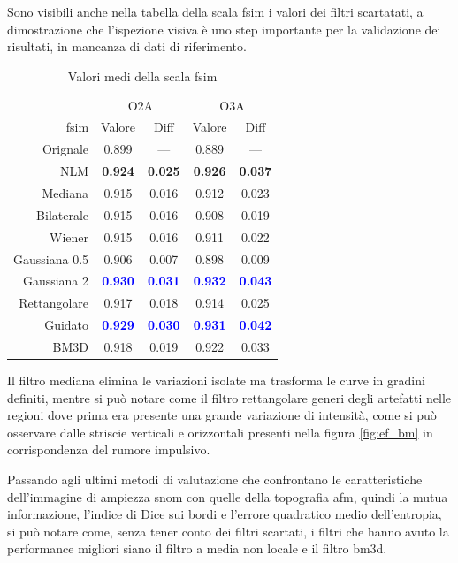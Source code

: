 \documentclass[../main.tex]{subfiles}
\begin{document}
Sono visibili anche nella tabella della scala \acrshort{fsim} i valori dei filtri scartatati, a dimostrazione che l'ispezione visiva è uno step importante per la validazione dei risultati, in mancanza di dati di riferimento.\medskip

\begin{table}[ht]
	\centering
	\begin{tabular}{r||cc|cc}
		&  \multicolumn{2}{c|}{O2A} &  \multicolumn{2}{c}{O3A}  \\
		\acrshort{fsim}\hspace{10pt} & Valore & Diff & Valore & Diff \\		\hline\hline
		Orignale   		& 0.899 & ---   & 0.889 & --- \\
		NLM         	& \textbf{0.924} & \textbf{0.025} & \textbf{0.926} & \textbf{0.037} \\
		Mediana     	& 0.915 & 0.016 & 0.912 & 0.023 \\
		Bilaterale    	& 0.915 & 0.016 & 0.908 & 0.019 \\
		Wiener        	& 0.915 & 0.016 & 0.911 & 0.022 \\
		Gaussiana 0.5 	& 0.906 & 0.007 & 0.898 & 0.009 \\
		Gaussiana 2   	& \textcolor{blue}{\textbf{0.930}} & \textcolor{blue}{\textbf{0.031}} & \textcolor{blue}{\textbf{0.932}} & \textcolor{blue}{\textbf{0.043}} \\
		Rettangolare 	& 0.917 & 0.018 & 0.914 & 0.025 \\
		Guidato        	& \textcolor{blue}{\textbf{0.929}} & \textcolor{blue}{\textbf{0.030}} & \textcolor{blue}{\textbf{0.931}} & \textcolor{blue}{\textbf{0.042}} \\
		BM3D   			& 0.918 & 0.019     & 0.922 & 0.033
	\end{tabular}
	\caption[Valori medi della scala FSIM]{
		Valori medi della scala \acrshort{fsim}}
\end{table}

Il filtro mediana elimina le variazioni isolate ma trasforma le curve in gradini definiti, mentre si può notare come il filtro rettangolare generi degli artefatti nelle regioni dove prima era presente una grande variazione di intensità, come si può osservare dalle striscie verticali e orizzontali presenti nella figura \ref{fig:ef_bm} in corrispondenza del rumore impulsivo.

Passando agli ultimi metodi di valutazione che confrontano le caratteristiche dell'immagine di ampiezza \acrshort{snom} con quelle della topografia \acrshort{afm}, quindi la mutua informazione, l'indice di Dice sui bordi e l'errore quadratico medio dell'entropia, si può notare come, senza tener conto dei filtri scartati, i filtri che hanno avuto la performance migliori siano il filtro a media non locale e il filtro \acrshort{bm3d}.\medskip
\end{document}
